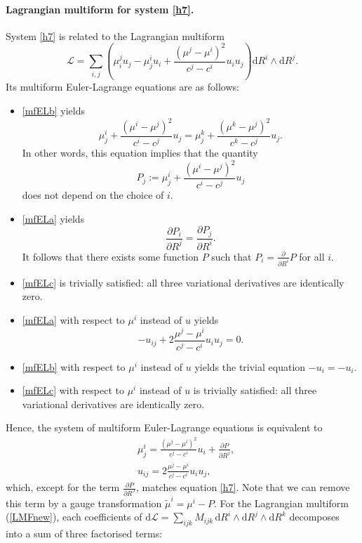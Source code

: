 \documentclass[12pt, a4paper]{article}
\theoremstyle{definition}
\renewcommand{\d}{\mathrm{d}}
\newcommand{\cL}{\mathcal{L}}
\newcommand{\der}[2]{\frac{\partial #1}{\partial #2}}
\begin{document}
\paragraph{Lagrangian multiform for system \eqref{h7}.} System \eqref{h7} is related to the Lagrangian multiform
\begin{equation}\label{LMFnew}
	\cL = \sum_{i,j} \left( \mu^j_i u_j - \mu^i_j u_i + \frac{(\mu^j - \mu^i)^2}{c^j - c^i} u_i u_j \right) \d R^i\wedge \d R^j .
\end{equation}
Its multiform Euler-Lagrange equations are as follows:
\begin{itemize}
	\item \eqref{mfELb} yields
	\[ \mu_j^i + \frac{(\mu^i - \mu^j)^2}{c^i- c^j} u_j = \mu_j^k + \frac{(\mu^k - \mu^j)^2}{c^k - c^j} u_j. \]
	In other words, this equation implies that the quantity
	\[ P_j:= \mu_j^i+ \frac{(\mu^i- \mu^j)^2}{c^i - c^j} u_j \]
	does not depend on the choice of $i$.
	
	
	\item  \eqref{mfELa} yields
	\[ \der{P_i}{R^j} = \der{P_j}{R^i}. \]
	It follows that there exists some function $P$ such that $P_i = \der{}{R^i} P$ for all $i$.
	
	\item \eqref{mfELc} is trivially satisfied: all three variational derivatives are identically zero.
	
	\item \eqref{mfELa} with respect to $\mu^i$ instead of $u$ yields
	\[ -u_{ij} + 2 \frac{\mu^j - \mu^i}{c^j - c^i} u_i u_j = 0 .\]
	
	\item \eqref{mfELb} with respect to $\mu^i$ instead of $u$ yields the trivial equation $-u_i = -u_i$.
	
	\item \eqref{mfELc} with respect to $\mu^i$ instead of $u$ is trivially satisfied: all three variational derivatives are identically zero.
\end{itemize}
Hence, the system of multiform Euler-Lagrange equations is equivalent to
\begin{align*}
	& \mu_j^i = \frac{(\mu^j - \mu^i)^2}{c^j - c^i} u_i + \der{P}{R^j}, \\
	&  u_{ij} = 2 \frac{\mu^j - \mu^i}{c^j - c^i} u_i u_j,
\end{align*}
which, except for the term $\der{P}{R^J}$, matches equation \eqref{h7}. Note that we can remove this term by a gauge transformation $\tilde \mu^i = \mu^i - P$.
For the Lagrangian multiform (\ref{LMFnew}),  each coefficients of $\d \cL = \sum_{ijk} M_{ijk} \,\d R^i \wedge \d R^j \wedge \d R^k$ decomposes into a sum of three factorised terms:
\end{document}

